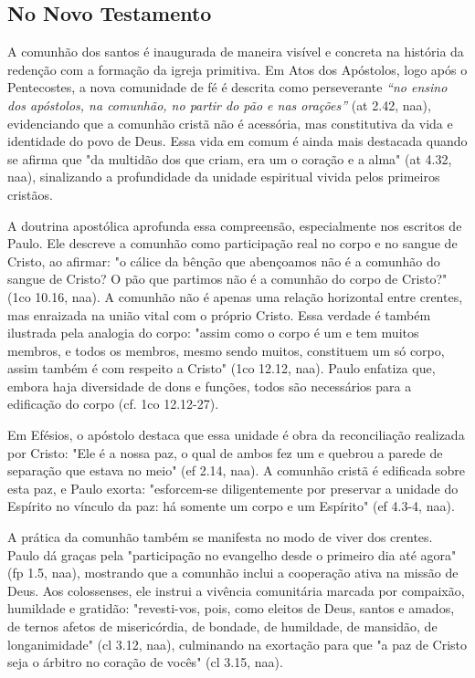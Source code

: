 \subsection{No Novo Testamento}

A comunhão dos santos é inaugurada de maneira visível e concreta na história da redenção com a formação da igreja primitiva. Em Atos dos Apóstolos, logo após o Pentecostes, a nova comunidade de fé é descrita como perseverante \textit{``no ensino dos apóstolos, na comunhão, no partir do pão e nas orações''} (\gls{at} 2.42, \gls{naa}), evidenciando que a comunhão cristã não é acessória, mas constitutiva da vida e identidade do povo de Deus. Essa vida em comum é ainda mais destacada quando se afirma que "da multidão dos que criam, era um o coração e a alma" (\gls{at} 4.32, \gls{naa}), sinalizando a profundidade da unidade espiritual vivida pelos primeiros cristãos.

A doutrina apostólica aprofunda essa compreensão, especialmente nos escritos de Paulo. Ele descreve a comunhão como participação real no corpo e no sangue de Cristo, ao afirmar: "o cálice da bênção que abençoamos não é a comunhão do sangue de Cristo? O pão que partimos não é a comunhão do corpo de Cristo?" (\gls{1co} 10.16, \gls{naa}). A comunhão não é apenas uma relação horizontal entre crentes, mas enraizada na união vital com o próprio Cristo. Essa verdade é também ilustrada pela analogia do corpo: "assim como o corpo é um e tem muitos membros, e todos os membros, mesmo sendo muitos, constituem um só corpo, assim também é com respeito a Cristo" (\gls{1co} 12.12, \gls{naa}). Paulo enfatiza que, embora haja diversidade de dons e funções, todos são necessários para a edificação do corpo (cf. \gls{1co} 12.12-27).

Em Efésios, o apóstolo destaca que essa unidade é obra da reconciliação realizada por Cristo: "Ele é a nossa paz, o qual de ambos fez um e quebrou a parede de separação que estava no meio" (\gls{ef} 2.14, \gls{naa}). A comunhão cristã é edificada sobre esta paz, e Paulo exorta: "esforcem-se diligentemente por preservar a unidade do Espírito no vínculo da paz: há somente um corpo e um Espírito" (\gls{ef} 4.3-4, \gls{naa}).

A prática da comunhão também se manifesta no modo de viver dos crentes. Paulo dá graças pela "participação no evangelho desde o primeiro dia até agora" (\gls{fp} 1.5, \gls{naa}), mostrando que a comunhão inclui a cooperação ativa na missão de Deus. Aos colossenses, ele instrui a vivência comunitária marcada por compaixão, humildade e gratidão: "revesti-vos, pois, como eleitos de Deus, santos e amados, de ternos afetos de misericórdia, de bondade, de humildade, de mansidão, de longanimidade" (\gls{cl} 3.12, \gls{naa}), culminando na exortação para que "a paz de Cristo seja o árbitro no coração de vocês" (\gls{cl} 3.15, \gls{naa}).

